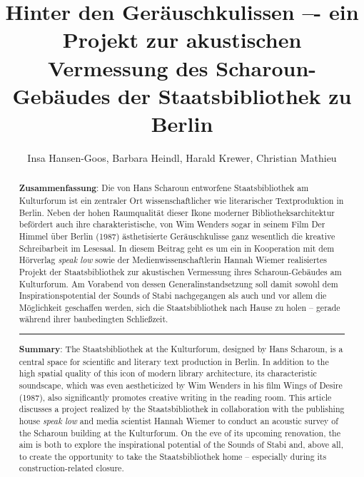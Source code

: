 \documentclass[a4paper,
fontsize=11pt,
oneside,
numbers=noperiodatend,
parskip=half-,
bibliography=totoc,
final
]{scrartcl}
\title{\LARGE{Hinter den Geräuschkulissen –- ein Projekt zur akustischen Vermessung des Scharoun-Gebäudes der Staatsbibliothek zu Berlin}} %
\author{Insa Hansen-Goos, Barbara Heindl, Harald Krewer, Christian Mathieu}
\date{}
\begin{document}
\maketitle
\thispagestyle{fancyplain} 

\begin{abstract}
\noindent
\textbf{Zusammenfassung}: Die von Hans Scharoun entworfene
Staatsbibliothek am Kulturforum ist ein zentraler Ort wissenschaftlicher
wie literarischer Textproduktion in Berlin. Neben der hohen Raumqualität
dieser Ikone moderner Bibliotheksarchitektur befördert auch ihre
charakteristische, von Wim Wenders sogar in seinem Film Der Himmel über
Berlin (1987) ästhetisierte Geräuschkulisse ganz wesentlich die
kreative Schreibarbeit im Lesesaal. In diesem Beitrag geht es um ein in
Kooperation mit dem Hörverlag \textit{speak low} sowie der
Medienwissenschaftlerin Hannah Wiemer realisiertes Projekt der
Staatsbibliothek zur akustischen Vermessung ihres Scharoun-Gebäudes am
Kulturforum. Am Vorabend von dessen Generalinstandsetzung soll damit
sowohl dem Inspirationspotential der Sounds of Stabi nachgegangen als
auch und vor allem die Möglichkeit geschaffen werden, sich die
Staatsbibliothek nach Hause zu holen -- gerade während ihrer
baubedingten Schließzeit.

\begin{center}\rule{0.5\linewidth}{0.5pt}\end{center}

\textbf{Summary}: The Staatsbibliothek at the Kulturforum, designed by
Hans Scharoun, is a central space for scientific and literary text
production in Berlin. In addition to the high spatial quality of this
icon of modern library architecture, its characteristic soundscape,
which was even aestheticized by Wim Wenders in his film Wings of Desire
(1987), also significantly promotes creative writing in the reading
room. This article discusses a project realized by the Staatsbibliothek
in collaboration with the publishing house \textit{speak low} and media scientist
Hannah Wiemer to conduct an acoustic survey of the Scharoun building at
the Kulturforum. On the eve of its upcoming renovation, the aim is both
to explore the inspirational potential of the Sounds of Stabi and, above
all, to create the opportunity to take the Staatsbibliothek home --
especially during its construction-related closure.
\end{abstract}
\end{document}
